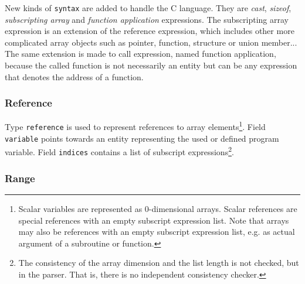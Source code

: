 \documentclass[a4paper]{article}
\begin{document}
New kinds of \verb/syntax/ are added to handle the C language. They
are {\it cast}, {\it sizeof}, {\it subscripting array} and {\it
  function application} expressions. The subscripting array expression
is an extension of the reference expression, which includes other more
complicated array objects such as pointer, function, structure or
union member... The same extension is made to call expression, named
function application, because the called function is not necessarily
an entity but can be any expression that denotes the address of a function.


\subsubsection{Reference}
\label{subsubsection-reference}

{}
{}
{}

Type \verb/reference/ is used to represent references to array
elements\footnote{Scalar variables are represented as 0-dimensional
arrays. Scalar references are special references with an empty subscript
expression list. Note that arrays may also be references with an empty
subscript expression list, e.g. as actual argument of a subroutine or
function.}. Field \verb/variable/ points towards an entity representing
the used or defined program variable. Field \verb/indices/ contains a
list of subscript expressions\footnote{The consistency of the array dimension
and the list length is not checked, but in the parser. That is, there is
no independent consistency checker.}.

\begin{comment}
Le domaine \verb/reference/ est utilis� pour repr�senter une
r�f�rence � un �l�ment de tableau\footnote{Les variables scalaires
�tant repr�sent�es par des tableaux de dimension 0, les r�f�rences
a des scalaires sont aussi prises en compte. Elles contiennent une liste
vide d'expressions d'indices.}.  Le sous-domaine \verb/variable/
contient une entit� d�finissant la variable r�f�renc�e. Le
sous-domaine \verb/indices/ contient une liste \texttt{expression}s qui sont les
indices de la r�f�rence.
\end{comment}

\subsubsection{Range}
\end{document}
